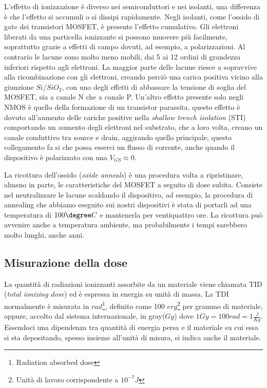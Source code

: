 L'effetto di ionizzazione è diverso nei semiconduttori e nei isolanti, una differenza è che l'effetto si accumuli o si dissipi rapidamente.
Negli isolanti, come l'ossido di gate dei transistori MOSFET, è presente l'effetto cumulativo. Gli elettroni liberati da una particella ionizzante si possono muovere più facilmente, soprattutto grazie a effetti di campo dovuti, ad esempio, a polarizzazioni.
Al contrario le lacune sono molto meno mobili, dai 5 ai 12 ordini di grandezza inferiori rispetto agli elettroni. La maggior parte delle lacune riesce a sopravvive alla ricombinazione con gli elettroni, creando perciò una carica positiva vicino alla giunzione $Si/SiO_2$, con uno degli effetti di abbassare la tensione di soglia del MOSFET, sia a canale N che a canale P.
Un'altro effetto presente solo negli NMOS è quello della formazione di un transistor parassita\cite{effetti_radiazioni:CMOS_IC_radiation_hardening_by_design}, questo effetto è dovuto all'aumento delle cariche positive nella \textit{shallow trench isolation} (STI) comportando un aumento degli elettroni nel substrato, che a loro volta, creano un canale conduttivo tra source e drain, aggirando quello principale; questo collegamento fa si che possa esserci un flusso di corrente, anche quando il dispositivo è polarizzato con una $V_{GS} \approx 0$.

\vspace{0.5cm}


La ricottura dell'ossido (\textit{oxide anneals}) è una procedura volta a ripristinare, almeno in parte, le caratteristiche del MOSFET a seguito di dose subita.
Consiste nel neutralizzare le lacune scaldando il dispositivo, ad esempio, la procedura di annealing che abbiamo eseguito sui nostri dispositivi è stata di portarli ad una temperatura di $100\degree C$ e mantenerla per ventiquattro ore. La ricottura può avvenire anche a temperatura ambiente, ma probabilmente i tempi sarebbero molto lunghi, anche anni\cite{bib:Effetti_Radiazioni_NASA}. 

\subsection{Misurazione della dose}
La quantità di radiazioni ionizzanti assorbite da un materiale viene chiamata TID (\textit{total ionizing dose}) ed è espressa in energia su unità di massa.
La TDI normalmente è misurata in $rad$\footnote{Radiation absorbed dose}, definito come 100 $erg$\footnote{Unità di lavoro corrispondente a $10^{-7} J$} per grammo di materiale, oppure, accolto dal sistema internazionale, in gray($Gy$) dove $1 Gy = 100rad = 1\frac{J}{Kg}$.
Essendoci una dipendenza tra quantità di energia persa e il materiale su cui essa si sta depositando, spesso insieme all'unità di misura, si indica anche il materiale. 




